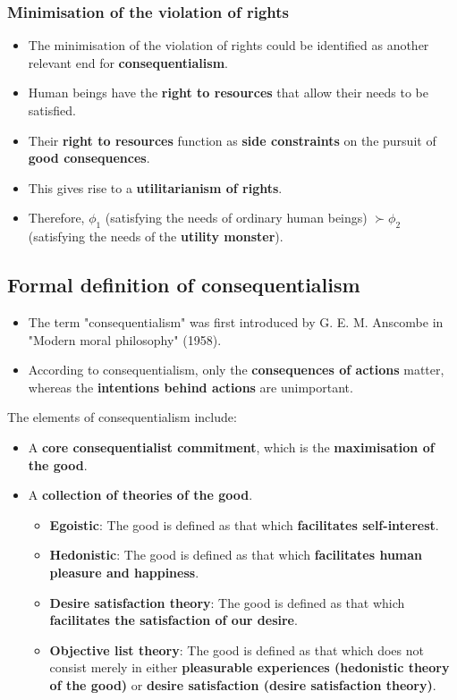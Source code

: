 \documentclass[11pt]{article}
\begin{document}
\subsubsection{Minimisation of the violation of rights}
\label{sec:orgfbf3e60}
\begin{itemize}
\item The minimisation of the violation of rights could be identified as another relevant end for \textbf{consequentialism}.
\item Human beings have the \textbf{right to resources} that allow their needs to be satisfied.
\item Their \textbf{right to resources} function as \textbf{side constraints} on the pursuit of \textbf{good consequences}.
\item This gives rise to a \textbf{utilitarianism of rights}.
\item Therefore, \(\phi_1\) (satisfying the needs of ordinary human beings) \(\succ \phi_2\) (satisfying the needs of the \textbf{utility monster}).
\end{itemize}
\subsection{Formal definition of consequentialism}
\label{sec:org89aa6dd}
\begin{itemize}
\item The term "consequentialism" was first introduced by G. E. M. Anscombe in "Modern moral philosophy" (1958).
\item According to consequentialism, only the \textbf{consequences of actions} matter, whereas the \textbf{intentions behind actions} are unimportant.
\end{itemize}

The elements of consequentialism include:
\begin{itemize}
\item A \textbf{core consequentialist commitment}, which is the \textbf{maximisation of the good}.
\item A \textbf{collection of theories of the good}.
\begin{itemize}
\item \textbf{Egoistic}: The good is defined as that which \textbf{facilitates self-interest}.
\item \textbf{Hedonistic}: The good is defined as that which \textbf{facilitates human pleasure and happiness}.
\item \textbf{Desire satisfaction theory}: The good is defined as that which \textbf{facilitates the satisfaction of our desire}.
\item \textbf{Objective list theory}: The good is defined as that which does not consist merely in either \textbf{pleasurable experiences (hedonistic theory of the good)} or \textbf{desire satisfaction (desire satisfaction theory)}.
\end{itemize}
\end{itemize}
\end{document}
